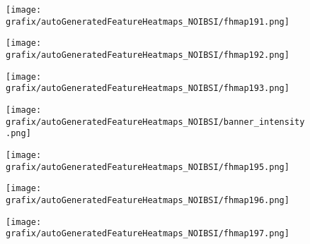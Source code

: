 \hspace{\hsp} 
\begin{subfigure}{\wid\textwidth} 
    \centering 
    \caption{\tiny \sffamily {}} 
    \vspace{\vsp} 
    \texttt{[image: grafix/autoGeneratedFeatureHeatmaps\_NOIBSI/fhmap191.png]} 
\end{subfigure} 
\hspace{\hsp} 
\begin{subfigure}{\wid\textwidth} 
    \centering 
    \caption{\tiny \sffamily {}} 
    \vspace{\vsp} 
    \texttt{[image: grafix/autoGeneratedFeatureHeatmaps\_NOIBSI/fhmap192.png]} 
\end{subfigure} 
\hspace{\hsp} 
\begin{subfigure}{\wid\textwidth} 
    \centering 
    \caption{\tiny \sffamily {}} 
    \vspace{\vsp} 
    \texttt{[image: grafix/autoGeneratedFeatureHeatmaps\_NOIBSI/fhmap193.png]} 
\end{subfigure} 
\hspace{\hsp} 
\begin{subfigure}{\wid\textwidth} 
    \texttt{[image: grafix/autoGeneratedFeatureHeatmaps\_NOIBSI/banner\_intensity.png]} 
\end{subfigure} 
\hspace{\hsp} 
\begin{subfigure}{\wid\textwidth} 
    \centering 
    \caption{\tiny \sffamily {}} 
    \vspace{\vsp} 
    \texttt{[image: grafix/autoGeneratedFeatureHeatmaps\_NOIBSI/fhmap195.png]} 
\end{subfigure} 
\hspace{\hsp} 
\begin{subfigure}{\wid\textwidth} 
    \centering 
    \caption{\tiny \sffamily {}} 
    \vspace{\vsp} 
    \texttt{[image: grafix/autoGeneratedFeatureHeatmaps\_NOIBSI/fhmap196.png]} 
\end{subfigure} 
\hspace{\hsp} 
\begin{subfigure}{\wid\textwidth} 
    \centering 
    \caption{\tiny \sffamily {}} 
    \vspace{\vsp} 
    \texttt{[image: grafix/autoGeneratedFeatureHeatmaps\_NOIBSI/fhmap197.png]} 
\end{subfigure} 

